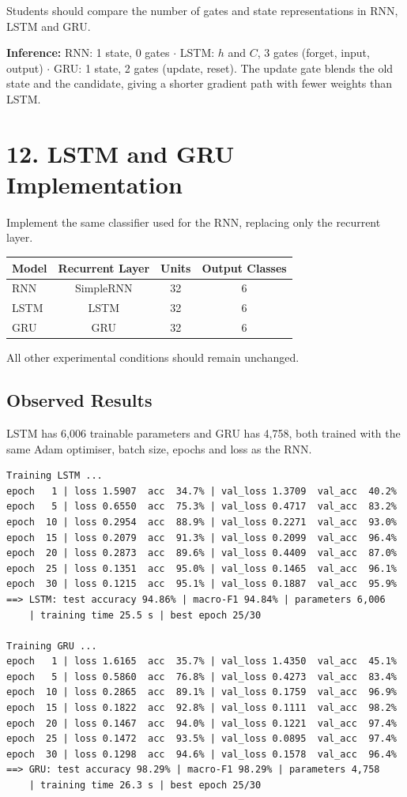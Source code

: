 \documentclass[10pt]{article}
\begin{document}
Students should compare the number of gates and state representations in
RNN, LSTM and GRU.

\textbf{Inference:} RNN: 1 state, 0 gates $\cdot$ LSTM: $h$ and $C$, 3 gates
(forget, input, output) $\cdot$ GRU: 1 state, 2 gates (update, reset). The
update gate blends the old state and the candidate, giving a shorter
gradient path with fewer weights than LSTM.

\section*{12. LSTM and GRU Implementation}

Implement the same classifier used for the RNN, replacing only the recurrent
layer.

\begin{center}
\begin{tabular}{|l|c|c|c|}
\hline
Model & Recurrent Layer & Units & Output Classes\\
\hline
RNN & SimpleRNN & 32 & 6\\
LSTM & LSTM & 32 & 6\\
GRU & GRU & 32 & 6\\
\hline
\end{tabular}
\end{center}

All other experimental conditions should remain unchanged.

\subsection*{Observed Results}

LSTM has 6{,}006 trainable parameters and GRU has 4{,}758, both trained with
the same Adam optimiser, batch size, epochs and loss as the RNN.

\begin{verbatim}
Training LSTM ...
epoch   1 | loss 1.5907  acc  34.7% | val_loss 1.3709  val_acc  40.2%
epoch   5 | loss 0.6550  acc  75.3% | val_loss 0.4717  val_acc  83.2%
epoch  10 | loss 0.2954  acc  88.9% | val_loss 0.2271  val_acc  93.0%
epoch  15 | loss 0.2079  acc  91.3% | val_loss 0.2099  val_acc  96.4%
epoch  20 | loss 0.2873  acc  89.6% | val_loss 0.4409  val_acc  87.0%
epoch  25 | loss 0.1351  acc  95.0% | val_loss 0.1465  val_acc  96.1%
epoch  30 | loss 0.1215  acc  95.1% | val_loss 0.1887  val_acc  95.9%
==> LSTM: test accuracy 94.86% | macro-F1 94.84% | parameters 6,006
    | training time 25.5 s | best epoch 25/30

Training GRU ...
epoch   1 | loss 1.6165  acc  35.7% | val_loss 1.4350  val_acc  45.1%
epoch   5 | loss 0.5860  acc  76.8% | val_loss 0.4273  val_acc  83.4%
epoch  10 | loss 0.2865  acc  89.1% | val_loss 0.1759  val_acc  96.9%
epoch  15 | loss 0.1822  acc  92.8% | val_loss 0.1111  val_acc  98.2%
epoch  20 | loss 0.1467  acc  94.0% | val_loss 0.1221  val_acc  97.4%
epoch  25 | loss 0.1472  acc  93.5% | val_loss 0.0895  val_acc  97.4%
epoch  30 | loss 0.1298  acc  94.6% | val_loss 0.1578  val_acc  96.4%
==> GRU: test accuracy 98.29% | macro-F1 98.29% | parameters 4,758
    | training time 26.3 s | best epoch 25/30
\end{verbatim}
\end{document}
